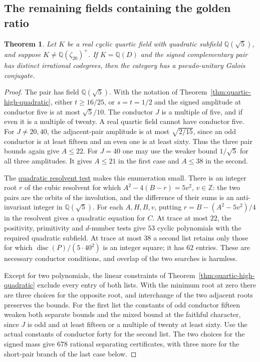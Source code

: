 \documentclass[11pt,reqno]{amsart}
\newcommand{\codecheck}[2]{\href{https://github.com/sebastienpalcoux/grothendieck-ring-classification/blob/d5750105bb5758f3ad38d2e5464dfcc12c019816/supplements/rank6/sphericality/#1}{#2}}
\newtheorem{theorem}{Theorem}[section]
\theoremstyle{remark}\newtheorem{remark}[theorem]{Remark}
\numberwithin{equation}{section}
\begin{document}
\subsection{The remaining fields containing the golden ratio}
\begin{theorem}\label{thm:quartic-cyclic-golden-family}
Let $K$ be a real cyclic quartic field with quadratic subfield $\mathbb Q(\sqrt5)$, and suppose $K\ne\mathbb Q(\zeta_{20})^+$. If $K=\mathbb Q(D)$ and the signed complementary pair has distinct irrational codegrees, then the category has a pseudo-unitary Galois conjugate.
\end{theorem}
\begin{proof}
The pair has field $\mathbb Q(\sqrt5)$. With the notation of Theorem~\ref{thm:quartic-high-quadratic}, either $t\ge16/25$, or $s=t=1/2$ and the signed amplitude at conductor five is at most $\sqrt5/10$. The conductor $J$ is a multiple of five, and if even it is a multiple of twenty. A real quartic field cannot have conductor five. For $J\ne20,40$, the adjacent-pair amplitude is at most $\sqrt{2/15}$, since an odd conductor is at least fifteen and an even one is at least sixty. Thus the three pair bounds again give $A\le22$. For $J=40$ one may use the weaker bound $1/\sqrt5$ for all three amplitudes. It gives $A\le21$ in the first case and $A\le38$ in the second.

The \codecheck{generic_quartic/cyclic_five.py}{quadratic resolvent test} makes this enumeration small. There is an integer root $r$ of the cubic resolvent for which $A^2-4(B-r)=5v^2$, $v\in\mathbb Z$: the two pairs are the orbits of the involution, and the difference of their sums is an anti-invariant integer in $\mathbb Q(\sqrt5)$. For each $A,H,B,v$, putting $r=B-(A^2-5v^2)/4$ in the resolvent gives a quadratic equation for $C$. At trace at most $22$, the positivity, primitivity and $d$-number tests give $53$ cyclic polynomials with the required quadratic subfield. At trace at most $38$ a second list retains only those for which $\operatorname{disc}(P)/(5\cdot40^2)$ is an integer square; it has $62$ entries. These are necessary conductor conditions, and overlap of the two searches is harmless.

Except for two polynomials, the linear constraints of Theorem~\ref{thm:quartic-high-quadratic} exclude every entry of both lists. With the minimum root at zero there are three choices for the opposite root, and interchange of the two adjacent roots preserves the bounds. For the first list the constants of odd conductor fifteen weaken both separate bounds and the mixed bound at the faithful character, since $J$ is odd and at least fifteen or a multiple of twenty at least sixty. Use the actual constants of conductor forty for the second list. The two choices for the signed mass give $678$ rational separating certificates, with three more for the short-pair branch of the last case below.


\end{proof}
\end{document}
